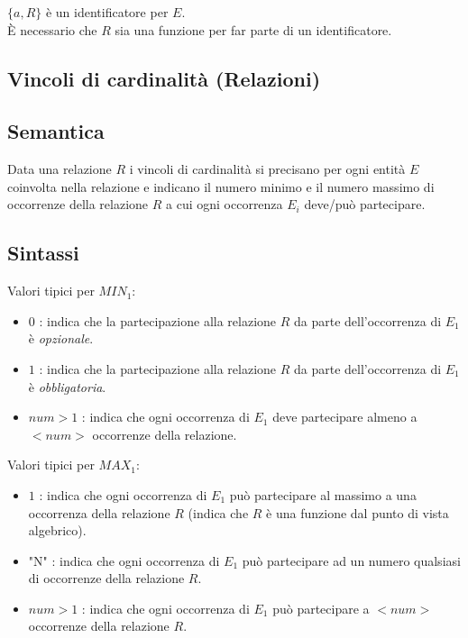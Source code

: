 \documentclass[a4paper, 10pt]{article}
\theoremstyle{definition}
\begin{document}
\begin{itemize}
						$ \{a,R\} $ è un identificatore per $E$. \\
						È necessario che $R$ sia una funzione per far parte di un identificatore.
						
					\end{itemize}
					
					
					\newpage
					
			\subsection{Vincoli di cardinalità (Relazioni)}
				\subsection*{Semantica}
					Data una relazione $R$ i vincoli di cardinalità si precisano per ogni entità $E$ coinvolta nella relazione e indicano il numero minimo e il numero massimo di occorrenze della relazione $R$ a cui ogni occorrenza $E_i$ deve/può partecipare.
				\subsection*{Sintassi}
					
					
					\bigskip 
					\hspace*{-.5cm}Valori tipici per $MIN_1$:
					\begin{itemize}
						\item $0$ : indica che la partecipazione alla relazione $R$ da parte dell'occorrenza di $E_1$ è \textit{opzionale}.
						\item $1$ : indica che la partecipazione alla relazione $R$ da parte dell'occorrenza di $E_1$ è \textit{obbligatoria}.
						\item $num > 1$ : indica che ogni occorrenza di $E_1$ deve partecipare almeno a $<num>$ occorrenze della relazione.
					\end{itemize}
					 Valori tipici per $MAX_1$:
					\begin{itemize}
						\item $1$ : indica che ogni occorrenza di $E_1$ può partecipare al massimo a una occorrenza della relazione $R$ (indica che $R$ è una funzione dal punto di vista algebrico).
						\item "N" : indica che ogni occorrenza di $E_1$ può partecipare ad un numero qualsiasi di occorrenze della relazione $R$.
						\item $num > 1$ : indica che ogni occorrenza di $E_1$ può partecipare a $<num>$
						occorrenze della relazione $R$.
					\end{itemize}
\end{document}
